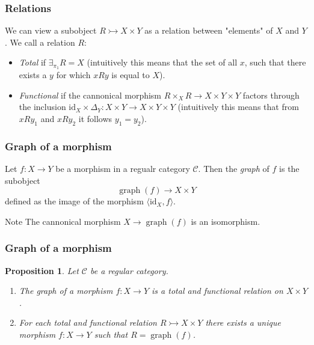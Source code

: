 \documentclass[14pt]{beamer}
\DeclareMathOperator{\graph}{graph}
\theoremstyle{plain}
\newtheorem{proposition}{Proposition}
\begin{document}
  \begin{frame}
    \frametitle{Relations}
    We can view a subobject $R \rightarrowtail X \times Y$ as a relation
    between "elements" of $X$ and $Y$. We call a relation $R$:
    \pause
    \begin{itemize}
      \item \emph{Total} if $\exists_{\pi_1}R = X$ 
        \pause
        (intuitively this means
        that the set of all $x$, such that there exists a $y$ for which $xRy$
        is equal to $X$).
        \pause
      \item \emph{Functional} if the cannonical morphism 
        $R \times_X R \to X \times Y \times Y$ factors through the inclusion
        $\mathrm{id}_X \times \Delta_Y : X \times Y \to X \times Y \times Y$
        \pause
        (intuitively this means that from $xRy_1$ and $xRy_2$ it follows
        $y_1 = y_2$).
    \end{itemize}

  \end{frame}

  \begin{frame}
    \frametitle{Graph of a morphism}
    \begin{definition}
      Let $f : X \to Y$ be a morphism in a regualr category $\mathcal{C}$.
      Then the \emph{graph} of $f$ is the subobject
      \[  \graph (f) \to X \times Y \]
      defined as the image of the morphism $\langle \mathrm{id}_X, f \rangle$.
    \end{definition}
    \begin{block}{Note}
      The cannonical morphism $X \to \graph(f)$ is an isomorphism.
    \end{block}
  \end{frame}

  \begin{frame}
    \frametitle{Graph of a morphism}
    \begin{proposition}
      Let $\mathcal{C}$ be a regular category.
      \begin{enumerate}
        \item[(i)]<2-> The graph of a morphism $f : X \to Y$ is a total and functional
          relation on $X \times Y$. 
        \item[(ii)]<3-> For each total and functional relation $R \rightarrowtail X \times Y$
          there exists a unique morphism $f : X \to Y$ such that $R = \graph(f)$. 
      \end{enumerate}
    \end{proposition}
  \end{frame}
\end{document}
